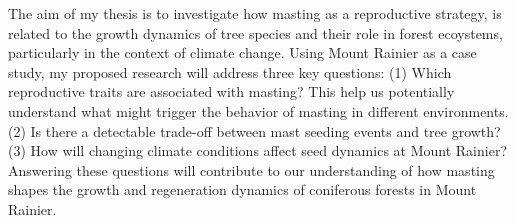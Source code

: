 \documentclass[11pt,letter]{article}
\begin{document}
The aim of my thesis is to investigate how masting as a reproductive strategy, is related to the growth dynamics of tree species and their role in forest ecoystems, particularly in the context of climate change. Using Mount Rainier as a case study, my proposed research will address three key questions: (1) Which reproductive traits are associated with masting? This help us potentially understand what might trigger the behavior of masting in different environments. (2) Is there a detectable trade-off between mast seeding events and tree growth? (3) How will changing climate conditions affect seed dynamics at Mount Rainier? Answering these questions will contribute to our understanding of how masting shapes the growth and regeneration dynamics of coniferous forests in Mount Rainier.\par
\end{document}
